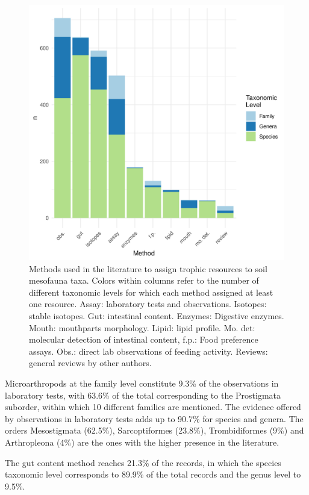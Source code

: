 \documentclass[10pt,oneside]{article}
\makeatletter
\def\maxwidth{\ifdim\Gin@nat@width>\linewidth\linewidth
\else\Gin@nat@width\fi}
\let\Oldincludegraphics\includegraphics
\renewcommand{\includegraphics}[1]{\Oldincludegraphics[width=\maxwidth]{#1}}
\makeatother
\begin{document}
\begin{figure}
\centering
\includegraphics{figures/Metodo_ByTaxLevel.png}
\caption{Methods used in the literature to assign trophic resources to
soil mesofauna taxa. Colors within columns refer to the number of
different taxonomic levels for which each method assigned at least one
resource. Assay: laboratory tests and observations. Isotopes: stable
isotopes. Gut: intestinal content. Enzymes: Digestive enzymes. Mouth:
mouthparts morphology. Lipid: lipid profile. Mo. det: molecular
detection of intestinal content, f.p.: Food preference assays. Obs.:
direct lab observations of feeding activity. Reviews: general reviews by
other authors.}
\end{figure}

Microarthropods at the family level constitute 9.3\% of the observations
in laboratory tests, with 63.6\% of the total corresponding to the
Prostigmata suborder, within which 10 different families are mentioned.
The evidence offered by observations in laboratory tests adds up to
90.7\% for species and genera. The orders Mesostigmata (62.5\%),
Sarcoptiformes (23.8\%), Trombidiformes (9\%) and Arthropleona (4\%) are
the ones with the higher presence in the literature.

The gut content method reaches 21.3\% of the records, in which the
species taxonomic level corresponds to 89.9\% of the total records and
the genus level to 9.5\%.
\end{document}
